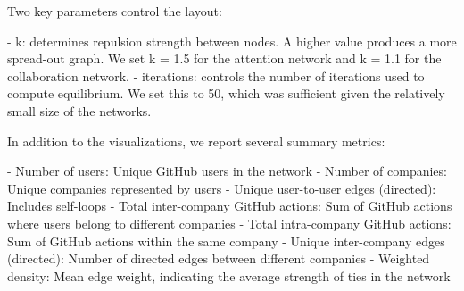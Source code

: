 Two key parameters control the layout:

- k: determines repulsion strength between nodes. A higher value produces a more spread-out graph. We set k = 1.5 for the attention network and k = 1.1 for the collaboration network.
- iterations: controls the number of iterations used to compute equilibrium. We set this to 50, which was sufficient given the relatively small size of the networks.

In addition to the visualizations, we report several summary metrics:

- Number of users: Unique GitHub users in the network
- Number of companies: Unique companies represented by users
- Unique user-to-user edges (directed): Includes self-loops
- Total inter-company GitHub actions: Sum of GitHub actions where users belong to different companies
- Total intra-company GitHub actions: Sum of GitHub actions within the same company
- Unique inter-company edges (directed): Number of directed edges between different companies
- Weighted density: Mean edge weight, indicating the average strength of ties in the network
